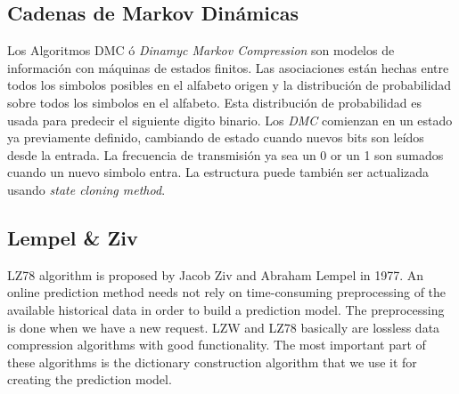  
 
 \subsection{Cadenas de Markov Dinámicas}
 
 
 Los Algoritmos DMC ó \emph{Dinamyc Markov Compression} son modelos de información con máquinas de estados finitos. Las asociaciones están hechas entre todos los simbolos posibles en el alfabeto origen y la distribución de probabilidad sobre todos los simbolos en el alfabeto. 
 Esta distribución de probabilidad es usada para predecir el siguiente digito binario. 
 Los \emph{DMC} comienzan en un estado ya previamente definido, cambiando de estado cuando nuevos bits son leídos desde la entrada. La frecuencia de transmisión ya sea un 0 or un 1 son sumados cuando un nuevo simbolo entra. La estructura puede también 
 ser actualizada usando \emph{state cloning method}.
 
 
\subsection{Lempel \& Ziv \cite{ZivLempel1977}}

LZ78 algorithm is proposed by Jacob Ziv and Abraham Lempel in 1977.
An online prediction method needs not rely on time-consuming preprocessing of the available historical data in order to build a prediction model. The preprocessing is done when we have a new request. LZW and LZ78 basically are lossless data compression algorithms with good functionality. The most important part of these algorithms is the dictionary construction algorithm that we use it for creating the prediction model.









